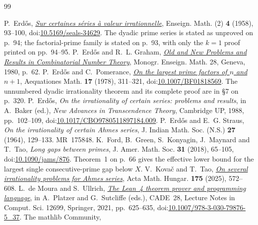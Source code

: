 \documentclass[11pt]{article}
\begin{document}
\begin{thebibliography}{99}
\small
\raggedright
\setlength{\itemsep}{0pt}
 P.~Erd\H{o}s,
  \href{https://users.renyi.hu/~p_erdos/1958-19.pdf}{\emph{Sur certaines
  s\'eries \`a valeur irrationnelle}},
  Enseign. Math. (2) \textbf{4} (1958), 93--100,
  doi:\href{https://doi.org/10.5169/seals-34629}{10.5169/seals-34629}.
  The dyadic prime series is stated as unproved on p.~94; the
  factorial-prime family is stated on p.~93, with only the $k=1$ proof printed
  on pp.~94--95.
 P.~Erd\H{o}s and R.~L. Graham,
  \href{https://mathweb.ucsd.edu/~ronspubs/80_11_number_theory.pdf}{\emph{Old
  and New Problems and Results in Combinatorial Number Theory}},
  Monogr. Enseign. Math. 28, Geneva, 1980, p.~62.
 P.~Erd\H{o}s and C.~Pomerance,
  \href{https://doi.org/10.1007/BF01818569}{\emph{On the largest prime
  factors of $n$ and $n+1$}},
  Aequationes Math. \textbf{17} (1978), 311--321,
  doi:\href{https://doi.org/10.1007/BF01818569}{10.1007/BF01818569}.
  The unnumbered dyadic irrationality theorem and its complete proof are in
  \S7 on p.~320.
 P.~Erd\H{o}s, \emph{On the irrationality of certain series:
  problems and results}, in A.~Baker (ed.), \emph{New Advances in Transcendence
  Theory}, Cambridge UP, 1988, pp.~102--109,
  doi:\href{https://doi.org/10.1017/CBO9780511897184.009}{10.1017/CBO9780511897184.009}.
 P.~Erd\H{o}s and E.~G. Straus, \emph{On the
  irrationality of certain Ahmes series}, J. Indian Math. Soc. (N.S.)
  \textbf{27} (1964), 129--133. MR~175848.
 K.~Ford, B.~Green, S.~Konyagin, J.~Maynard and T.~Tao,
  \emph{Long gaps between primes}, J. Amer. Math. Soc. \textbf{31} (2018),
  65--105,
  doi:\href{https://doi.org/10.1090/jams/876}{10.1090/jams/876}.
  Theorem~1 on p.~66 gives the effective lower bound for the largest single
  consecutive-prime gap below $X$.
 V.~Kova\v{c} and T.~Tao,
  \href{https://doi.org/10.1007/s10474-025-01528-0}{\emph{On several
  irrationality problems for Ahmes series}}, Acta Math. Hungar. \textbf{175}
  (2025), 572--608.
 L.~de Moura and S.~Ullrich,
  \href{https://doi.org/10.1007/978-3-030-79876-5_37}
  {\emph{The Lean~4 theorem prover and programming language}},
  in A.~Platzer and G.~Sutcliffe (eds.), CADE~28,
  Lecture Notes in Comput. Sci. 12699, Springer, 2021, pp.~625--635,
  doi:\href{https://doi.org/10.1007/978-3-030-79876-5_37}
  {10.1007/978-3-030-79876-5\_37}.
 The mathlib Community,

\end{thebibliography}
\end{document}
